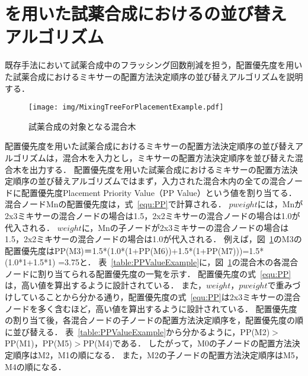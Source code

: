 \section{を用いた試薬合成におけるの並び替えアルゴリズム}
既存手法において試薬合成中のフラッシング回数削減を担う，配置優先度を用いた試薬合成におけるミキサーの配置方法決定順序の並び替えアルゴリズムを説明する．


\begin{figure}[tbp]
    \centering\texttt{[image: img/MixingTreeForPlacementExample.pdf]}
 \caption{試薬合成の対象となる混合木}\label{fig:placementTree}
\end{figure}

配置優先度を用いた試薬合成におけるミキサーの配置方法決定順序の並び替えアルゴリズムは，混合木を入力とし，ミキサーの配置方法決定順序を並び替えた混合木を出力する．
配置優先度を用いた試薬合成におけるミキサーの配置方法決定順序の並び替えアルゴリズムではまず，入力された混合木内の全ての混合ノードに配置優先度Placement Priority Value（PP Value）という値を割り当てる．
混合ノードMnの配置優先度は，式~\eqref{equ:PP}で計算される．
$pweight$には，Mnが2x3ミキサーの混合ノードの場合は1.5，2x2ミキサーの混合ノードの場合は1.0が代入される．
$weight$に，Mnの子ノードが2x3ミキサーの混合ノードの場合は1.5，2x2ミキサーの混合ノードの場合は1.0が代入される．
例えば，図~\ref{fig:placementTree}のM3の配置優先度はPP(M3)＝1.5*(1.0*(1+PP(M6))+1.5*(1+PP(M7)))=1.5*(1.0*1+1.5*1) =3.75と．
表~\ref{table:PPValueExample}に，図~\ref{fig:placementTree}の混合木の各混合ノードに割り当てられる配置優先度の一覧を示す．
配置優先度の式~\eqref{equ:PP}は，高い値を算出するように設計されている．
また，$weight，pweight$で重みづけしていることから分かる通り，配置優先度の式~\eqref{equ:PP}は2x3ミキサーの混合ノードを多く含むほど，高い値を算出するように設計されている．
配置優先度の割り当て後，各混合ノードの子ノードの配置方法決定順序を，配置優先度の順に並び替える．
表~\ref{table:PPValueExample}から分かるように，PP(M2)$>$PP(M1)，PP(M5)$>$PP(M4)である．
したがって，M0の子ノードの配置方法決定順序はM2，M1の順になる．
また，M2の子ノードの配置方法決定順序はM5，M4の順になる．


